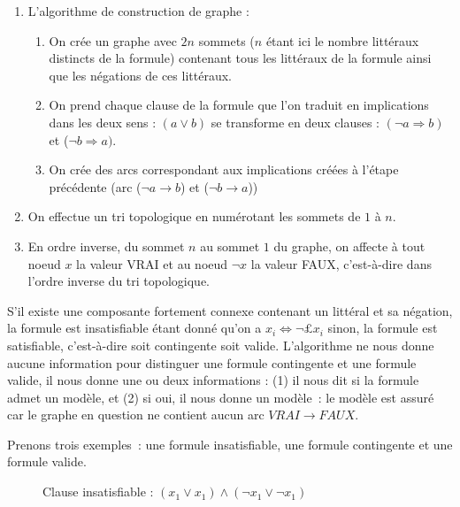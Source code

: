 \documentclass{article}
\begin{document}
\begin{enumerate}
\item L'algorithme de construction de graphe : 
\begin{enumerate}
\item On crée un graphe avec $2n$ sommets ($n$ étant ici le nombre littéraux distincts de la formule) contenant tous les littéraux de la formule ainsi que les négations de ces littéraux.
\item On prend chaque clause de la formule que l'on traduit en implications dans les deux sens : $(a \vee b)$ 
se transforme en deux clauses : $(\neg a \Rightarrow b)$ et ($\neg b \Rightarrow a)$.
\item On crée des arcs correspondant aux implications créées à l'étape précédente (arc ($\neg a 
\rightarrow b$) et ($\neg b \rightarrow a$))
\end{enumerate}
\item On effectue un tri topologique en numérotant les sommets de $1$ à $n$.
\item En ordre inverse, du sommet $n$ au sommet $1$ du graphe, on affecte à tout noeud $x$ la valeur VRAI et au noeud $\neg x$ la valeur FAUX, c'est-à-dire dans l'ordre inverse du tri topologique.
\end{enumerate}  	

S'il existe une composante fortement connexe contenant un littéral et sa négation, la formule est insatisfiable étant donné qu'on a $x_{i} \Leftrightarrow \neg £x_{i}$ sinon, la formule est satisfiable, c'est-à-dire soit contingente soit valide. L'algorithme ne nous donne aucune information pour distinguer une formule contingente et une formule valide, il nous donne une ou deux informations : (1) il nous dit si la formule admet un modèle, et (2) si oui, il nous donne un modèle~: le modèle est assuré car le graphe en question ne contient aucun arc $VRAI \rightarrow FAUX$.

Prenons trois exemples~: une formule insatisfiable, une formule contingente et une formule valide.

\begin{figure}[h!]
  \centering
  \caption{Clause insatisfiable : $(x_{1} \vee x_{1}) \wedge (\neg x_{1} \vee \neg x_{1})$}
  \label{fig:clause-insat}
\end{figure}
\end{document}
